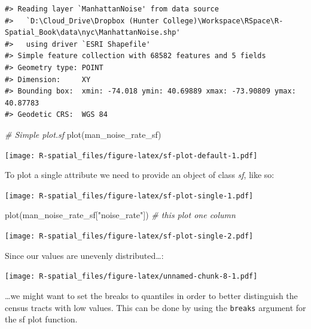 \documentclass[
  11pt,
]{book}
\newenvironment{Shaded}{\begin{snugshade}}{\end{snugshade}}
\newcommand{\CommentTok}[1]{\textcolor[rgb]{0.56,0.35,0.01}{\textit{#1}}}
\newcommand{\FunctionTok}[1]{\textcolor[rgb]{0.00,0.00,0.00}{#1}}
\newcommand{\NormalTok}[1]{#1}
\newcommand{\SpecialCharTok}[1]{\textcolor[rgb]{0.00,0.00,0.00}{#1}}
\newcommand{\StringTok}[1]{\textcolor[rgb]{0.31,0.60,0.02}{#1}}
\begin{document}
\begin{verbatim}
#> Reading layer `ManhattanNoise' from data source 
#>   `D:\Cloud_Drive\Dropbox (Hunter College)\Workspace\RSpace\R-Spatial_Book\data\nyc\ManhattanNoise.shp' 
#>   using driver `ESRI Shapefile'
#> Simple feature collection with 68582 features and 5 fields
#> Geometry type: POINT
#> Dimension:     XY
#> Bounding box:  xmin: -74.018 ymin: 40.69889 xmax: -73.90809 ymax: 40.87783
#> Geodetic CRS:  WGS 84
\end{verbatim}

\begin{Shaded}
\begin{Highlighting}[]
\CommentTok{\# Simple plot.sf}
\FunctionTok{plot}\NormalTok{(man\_noise\_rate\_sf)}
\end{Highlighting}
\end{Shaded}

\texttt{[image: R-spatial\_files/figure-latex/sf-plot-default-1.pdf]}

To plot a single attribute we need to provide an object of class \emph{sf}, like so:

\begin{Shaded}
\end{Shaded}

\texttt{[image: R-spatial\_files/figure-latex/sf-plot-single-1.pdf]}

\begin{Shaded}
\begin{Highlighting}[]
\FunctionTok{plot}\NormalTok{(man\_noise\_rate\_sf[}\StringTok{"noise\_rate"}\NormalTok{]) }\CommentTok{\# this plot one column}
\end{Highlighting}
\end{Shaded}

\texttt{[image: R-spatial\_files/figure-latex/sf-plot-single-2.pdf]}

Since our values are unevenly distributed\ldots:

\texttt{[image: R-spatial\_files/figure-latex/unnamed-chunk-8-1.pdf]}

\ldots we might want to set the breaks to quantiles in order to better distinguish the census tracts with low values. This can be done by using the \texttt{breaks} argument for the sf plot function.
\end{document}
